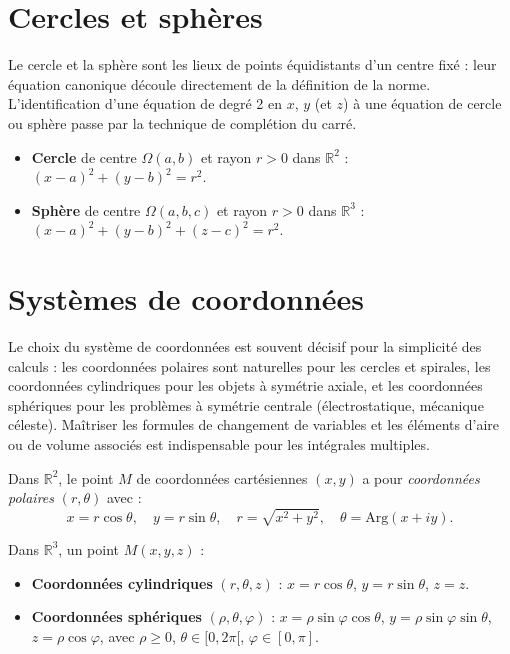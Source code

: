 \documentclass[11pt,a4paper,twoside]{book}
\newcommand{\R}{\mathbb{R}}
\begin{document}
\section{Cercles et sphères}

Le cercle et la sphère sont les lieux de points équidistants d'un centre fixé : leur équation canonique découle directement de la définition de la norme. L'identification d'une équation de degré 2 en $x$, $y$ (et $z$) à une équation de cercle ou sphère passe par la technique de complétion du carré.

\begin{definitionbox}
\begin{itemize}
  \item \textbf{Cercle} de centre $\Omega(a,b)$ et rayon $r>0$ dans $\R^2$ : $(x-a)^2+(y-b)^2=r^2$.
  \item \textbf{Sphère} de centre $\Omega(a,b,c)$ et rayon $r>0$ dans $\R^3$ : $(x-a)^2+(y-b)^2+(z-c)^2=r^2$.
\end{itemize}
\end{definitionbox}

\section{Systèmes de coordonnées}

Le choix du système de coordonnées est souvent décisif pour la simplicité des calculs : les coordonnées polaires sont naturelles pour les cercles et spirales, les coordonnées cylindriques pour les objets à symétrie axiale, et les coordonnées sphériques pour les problèmes à symétrie centrale (électrostatique, mécanique céleste). Maîtriser les formules de changement de variables et les éléments d'aire ou de volume associés est indispensable pour les intégrales multiples.

\begin{definitionbox}
Dans $\R^2$, le point $M$ de coordonnées cartésiennes $(x,y)$ a pour \emph{coordonnées polaires} $(r,\theta)$ avec :
\[
  x = r\cos\theta, \quad y = r\sin\theta, \quad r = \sqrt{x^2+y^2}, \quad \theta = \mathrm{Arg}(x+iy).
\]
\end{definitionbox}

\begin{definitionbox}
Dans $\R^3$, un point $M(x,y,z)$ :
\begin{itemize}
  \item \textbf{Coordonnées cylindriques} $(r,\theta,z)$ : $x=r\cos\theta$, $y=r\sin\theta$, $z=z$.
  \item \textbf{Coordonnées sphériques} $(\rho,\theta,\varphi)$ : $x=\rho\sin\varphi\cos\theta$, $y=\rho\sin\varphi\sin\theta$, $z=\rho\cos\varphi$,
    avec $\rho\geq0$, $\theta\in[0,2\pi[$, $\varphi\in[0,\pi]$.
\end{itemize}
\end{definitionbox}
\end{document}
